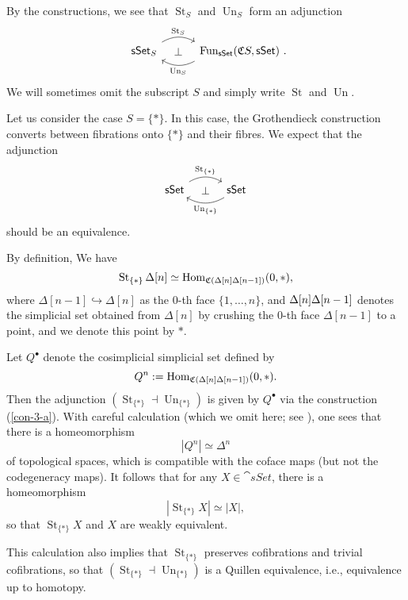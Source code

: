 By the constructions, we see that $\operatorname{St}_S$ and $\operatorname{Un}_S$
form an adjunction
\[\begin{tikzcd}[column sep=3em]
    \cat{sSet}_{\/S}\ar[r,bend left,start anchor=north east,end anchor=north west,"\operatorname{St}_S"]
    \ar[r,phantom,"\bot"] &
    \operatorname{Fun}_{\cat{sSet}}(\mathfrak CS,\cat{sSet})\rlap{\ .}
    \ar[l,bend left,start anchor=south west,end anchor=south east,"\operatorname{Un}_S"]
\end{tikzcd}\]
We will sometimes omit the subscript $S$ and simply write
$\operatorname{St}$ and $\operatorname{Un}$.

\begin{example}
    Let us consider the case $S=\{*\}$.
    In this case, the Grothendieck construction converts between
    fibrations onto $\{*\}$ and their fibres. We expect that the adjunction 
    \[\begin{tikzcd}[column sep=3em]
        \cat{sSet}\ar[r,bend left,"\operatorname{St}_{\{*\}}"]
        \ar[r,phantom,"\bot"] &
        \cat{sSet}
        \ar[l,bend left,"\operatorname{Un}_{\{*\}}"]
    \end{tikzcd}\]
    should be an equivalence.
    
    By definition, We have 
    \[ \operatorname{St}_{\{*\}}\Delta[n]\simeq\operatorname{Hom}_{\mathfrak C(\Delta[n]\/\Delta[n-1])}(0,*), \]
    where $\Delta[n-1]\hookrightarrow\Delta[n]$ as the $0$-th face $\{1,\dotsc,n\}$,
    and $\Delta[n]\/\Delta[n-1]$ denotes the simplicial set
    obtained from $\Delta[n]$ by crushing the $0$-th face $\Delta[n-1]$ to a point,
    and we denote this point by $*$.

    Let $Q^\bullet$ denote the cosimplicial simplicial set defined by 
    \[ Q^n:=\operatorname{Hom}_{\mathfrak C(\Delta[n]\/\Delta[n-1])}(0,*). \]
    Then the adjunction
    $(\operatorname{St}_{\{*\}}\dashv\operatorname{Un}_{\{*\}})$
    is given by $Q^\bullet$ via the construction (\ref{con-3-a}).
    With careful calculation (which we omit here; see \cite[Remark~2.2.2.6]{htt}),
    one sees that there is a homeomorphism
    \[ |Q^n|\simeq\Delta^n \]
    of topological spaces, which is compatible with the coface maps (but not the codegeneracy maps).
    It follows that for any $X\in\cat{sSet}$, there is a homeomorphism
    \[ |{\operatorname{St}_{\{*\}}X}|\simeq|X|, \]
    so that $\operatorname{St}_{\{*\}}X$ and $X$ are weakly equivalent.

    This calculation also implies that
    $\operatorname{St}_{\{*\}}$ preserves cofibrations and trivial cofibrations,
    so that $(\operatorname{St}_{\{*\}}\dashv\operatorname{Un}_{\{*\}})$
    is a Quillen equivalence, i.e., equivalence up to homotopy. \varqed
\end{example}

